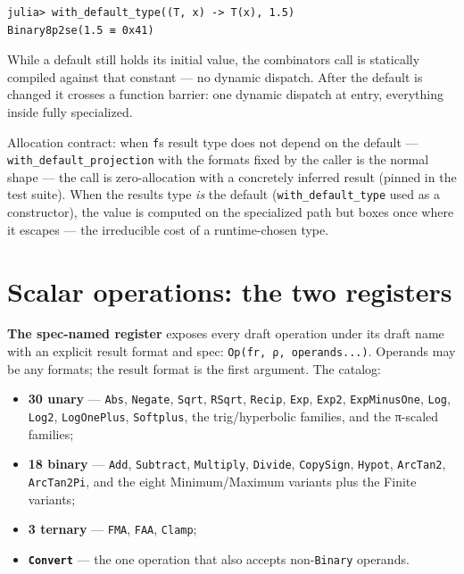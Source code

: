 \begin{verbatim}
julia> with_default_type((T, x) -> T(x), 1.5)
Binary8p2se(1.5 ≡ 0x41)
\end{verbatim}



While a default still holds its initial value, the combinator{\textquotesingle}s call is statically compiled against that constant — no dynamic dispatch. After the default is changed it crosses a function barrier: one dynamic dispatch at entry, everything inside fully specialized.



Allocation contract: when \texttt{f}{\textquotesingle}s result type does not depend on the default — \texttt{with\_default\_projection} with the formats fixed by the caller is the normal shape — the call is zero-allocation with a concretely inferred result (pinned in the test suite). When the result{\textquotesingle}s type \emph{is} the default (\texttt{with\_default\_type} used as a constructor), the value is computed on the specialized path but boxes once where it escapes — the irreducible cost of a runtime-chosen type.



\section{Scalar operations: the two registers}



\label{2538548316682979338}{}


\textbf{The spec-named register} exposes every draft operation under its draft name with an explicit result format and spec: \texttt{Op(fr, ρ, operands...)}. Operands may be any formats; the result format is the first argument. The catalog:



\begin{itemize}
\item \textbf{30 unary} — \texttt{Abs}, \texttt{Negate}, \texttt{Sqrt}, \texttt{RSqrt}, \texttt{Recip}, \texttt{Exp}, \texttt{Exp2}, \texttt{ExpMinusOne}, \texttt{Log}, \texttt{Log2}, \texttt{LogOnePlus}, \texttt{Softplus}, the trig/hyperbolic families, and the π-scaled families;


\item \textbf{18 binary} — \texttt{Add}, \texttt{Subtract}, \texttt{Multiply}, \texttt{Divide}, \texttt{CopySign}, \texttt{Hypot}, \texttt{ArcTan2}, \texttt{ArcTan2Pi}, and the eight Minimum/Maximum variants plus the Finite variants;


\item \textbf{3 ternary} — \texttt{FMA}, \texttt{FAA}, \texttt{Clamp};


\item \textbf{\texttt{Convert}} — the one operation that also accepts non-\texttt{Binary} operands.

\end{itemize}


